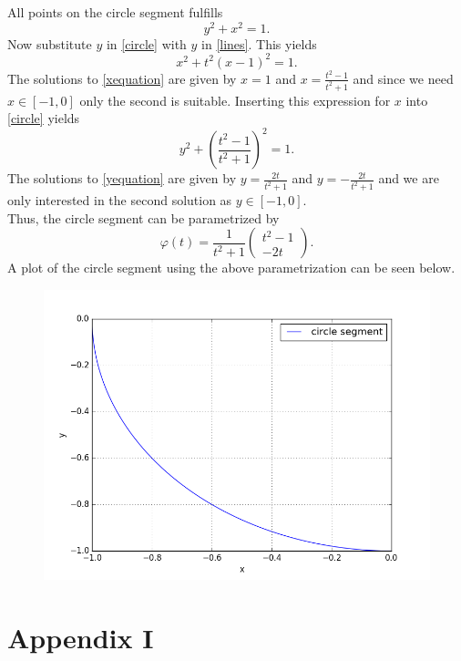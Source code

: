 \documentclass[]{article}
\begin{document}
All points on the circle segment fulfills \begin{equation}\label{circle}
y^2 + x^2 = 1.
\end{equation} 
Now substitute $y$ in \eqref{circle} with $y$ in \eqref{lines}. This yields\begin{equation}\label{xequation}
x^2 + t^2(x - 1)^2 = 1.
\end{equation}
The solutions to \eqref{xequation} are given by $x=1$ and $x=\frac{t^2 - 1}{t^2 + 1}$ and since we need $x\in [-1, 0]$ only the second is suitable. Inserting this expression for $x$ into \eqref{circle} yields\begin{equation}\label{yequation}
y^2 + \left(\frac{t^2 - 1}{t^2 + 1}\right)^2 = 1.
\end{equation}
The solutions to \eqref{yequation} are given by $y=\frac{2t}{t^2 + 1}$ and $y=-\frac{2t}{t^2 + 1}$ and we are only interested in the second solution as $y\in[-1, 0]$.\\
Thus, the circle segment can be parametrized by \begin{equation*}
\varphi(t)=\frac{1}{t^2 + 1}\left(\begin{array}{c}
t^2 - 1\\
-2t
\end{array}\right).
\end{equation*}
A plot of the circle segment using the above parametrization can be seen below.
\begin{figure}[h!]
	\includegraphics[scale=0.6]{circlesegment}
\end{figure}

\newpage
\section*{Appendix I}

\end{document}
